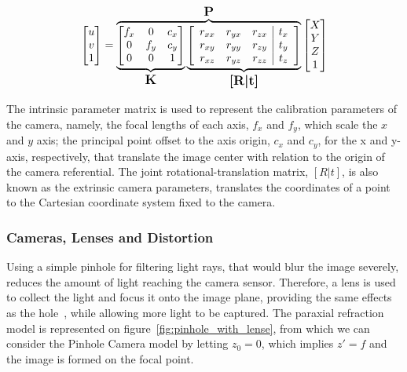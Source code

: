 \begin{equation}
	\label{eq:camera_transform_full}
	\begin{bmatrix}
		u \\
		v \\
		1
	\end{bmatrix}
	= 
	\overbrace{
		\underbrace{
			\begin{bmatrix}
				f_x & 0 & c_x \\
				0 & f_y & c_y \\
				0 & 0 & 1 
			\end{bmatrix}
		}_\text{\large\textbf{K}}
		\underbrace{
			\left[
				\begin{array}{ccc|c}
					r_{xx} & r_{yx} & r_{zx} & t_x \\
					r_{xy} & r_{yy} & r_{zy} & t_y \\
					r_{xz} & r_{yz} & r_{zz} & t_z 
				\end{array}
		\right]
		}_\text{\large\textbf{[R|t]}}
	}^\text{\large\textbf{P}}
	\begin{bmatrix}
		X \\
		Y \\
		Z \\
		1
	\end{bmatrix}
\end{equation}

The intrinsic parameter matrix is used to represent the calibration parameters of the camera, namely, the focal lengths of each axis, $f_x$ and $f_y$, which scale the $x$ and $y$ axis; the principal point offset to the axis origin, $c_x$ and $c_y$, for the x and y-axis, respectively, that translate the image center with relation to the origin of the camera referential. The joint rotational-translation matrix, $[R|t]$, is also known as the extrinsic camera parameters, translates the coordinates of a point to the Cartesian coordinate system fixed to the camera.


\subsubsection{Cameras, Lenses and Distortion}
Using a simple pinhole for filtering light rays, that would blur the image severely, reduces the amount of light reaching the camera sensor. Therefore, a lens is used to collect the light and focus it onto the image plane, providing the same effects as the hole~\cite{Sturm2010}, while allowing more light to be captured. The paraxial refraction model is represented on figure~\ref{fig:pinhole_with_lense}, from which we can consider the Pinhole Camera model by letting $z_0 = 0$, which implies $z' = f$ and the image is formed on the focal point.


